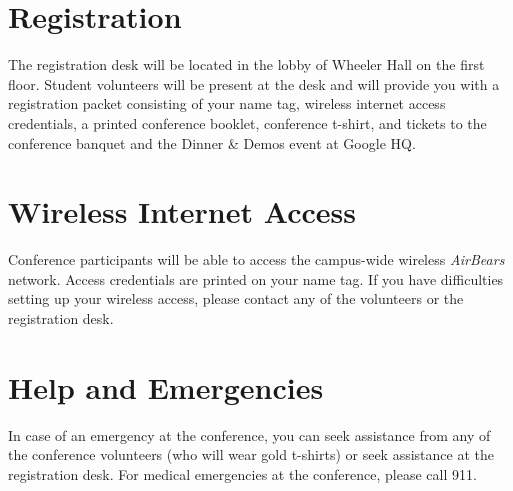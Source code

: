 
\vspace{3mm}

\section*{Registration}

The registration desk will be located in the lobby of Wheeler Hall on the first floor. Student volunteers will be present at the desk and will provide you with a registration packet consisting of your name tag, wireless internet access credentials, a printed conference booklet, conference t-shirt, and tickets to the conference banquet and the Dinner \& Demos event at Google HQ.

\vspace{3mm}
\section*{Wireless Internet Access}
Conference participants will be able to access the campus-wide wireless \emph{AirBears} network. Access credentials are printed on your name tag. If you have difficulties setting up your wireless access, please contact any of the volunteers or the registration desk.

\vspace{3mm}
\section*{Help and Emergencies}
In case of an emergency at the conference, you can seek assistance from any of the conference volunteers (who will wear gold t-shirts) or seek assistance at the registration desk. For medical emergencies at the conference, please call 911.

